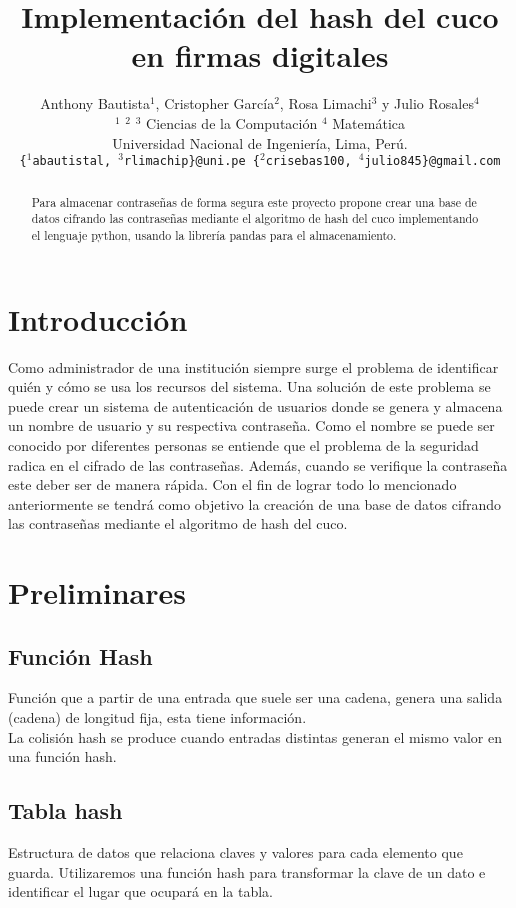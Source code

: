 \documentclass[final,a4paper,twocolumn,romanappendices]{IEEEtran}
\title{Implementación del hash del cuco en firmas digitales}
\author{Anthony Bautista$^{1}$, Cristopher García$^{2}$, Rosa Limachi$^{3}$ y Julio Rosales$^{4}$\\
\small{$^{1}$ $^{2}$ $^{3}$ Ciencias de la Computación $^{4}$ Matemática\\}
\small{Universidad Nacional de Ingeniería, Lima, Perú.\\}
\small{\texttt{\{$^{1}$abautistal, $^{3}$rlimachip\}@uni.pe \{$^{2}$crisebas100, $^{4}$julio845\}@gmail.com}}
}
\begin{document}
\maketitle

\begin{abstract}
Para almacenar contraseñas de forma segura este proyecto propone crear una base de datos cifrando las contraseñas mediante el algoritmo de hash del cuco implementando el lenguaje python, usando la librería pandas para el almacenamiento.







\end{abstract}

\section{Introducción}

Como administrador  de una institución siempre surge el problema de identificar quién y cómo se usa los recursos del sistema. Una solución de este problema se puede crear un sistema de autenticación de usuarios donde se genera y almacena un nombre de usuario y su respectiva contraseña. Como el nombre se puede ser conocido por diferentes personas se entiende que el problema de la seguridad radica en el cifrado de las contraseñas. Además, cuando se verifique la contraseña este deber ser de manera rápida. Con el fin de lograr todo lo mencionado anteriormente se tendrá como objetivo la creación de una base de datos cifrando las contraseñas mediante el algoritmo de hash del cuco.



\section{Preliminares}
\subsection{Función Hash}
Función que a partir de una entrada que suele ser una cadena, genera una salida (cadena) de longitud fija, esta tiene información.\\
La colisión hash se produce cuando entradas distintas generan el mismo valor en una función hash.

\subsection{Tabla hash}
Estructura de datos que relaciona claves y valores para cada elemento que guarda. Utilizaremos una función hash para transformar la clave de un dato e identificar el lugar que ocupará en la tabla.
\end{document}
